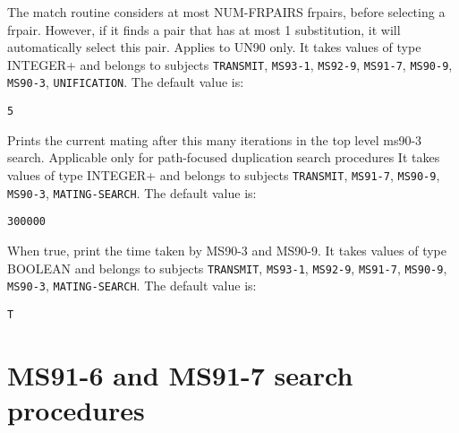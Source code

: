 \begin{description}
\item[NUM-FRPAIRS]  
The match routine considers at most NUM-FRPAIRS frpairs,
before selecting a frpair. However, if it finds a pair that has at
most 1 substitution, it will automatically select this pair.
Applies to UN90 only.
It takes values of type INTEGER+ and belongs to subjects \texttt{TRANSMIT}, \texttt{MS93-1}, \texttt{MS92-9}, \texttt{MS91-7}, \texttt{MS90-9}, \texttt{MS90-3}, \texttt{UNIFICATION}.  The default value is: \begin{lstlisting}
5
\end{lstlisting}

\item[PRINT-MATING-COUNTER]  
Prints the current mating after this many iterations in the
top level ms90-3 search. Applicable only for path-focused duplication
search procedures
It takes values of type INTEGER+ and belongs to subjects \texttt{TRANSMIT}, \texttt{MS91-7}, \texttt{MS90-9}, \texttt{MS90-3}, \texttt{MATING-SEARCH}.  The default value is: \begin{lstlisting}
300000
\end{lstlisting}

\item[SHOW-TIME]  
When true, print the time taken by MS90-3 and MS90-9.
It takes values of type BOOLEAN and belongs to subjects \texttt{TRANSMIT}, \texttt{MS93-1}, \texttt{MS92-9}, \texttt{MS91-7}, \texttt{MS90-9}, \texttt{MS90-3}, \texttt{MATING-SEARCH}.  The default value is: \begin{lstlisting}
T
\end{lstlisting}

\item
\end{description}

\section{MS91-6 and MS91-7 search procedures}

